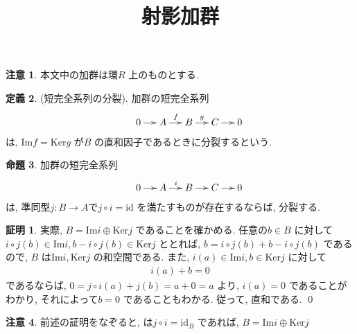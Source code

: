 \documentclass[10pt, fleqn, label-section=none]{bxjsarticle}
\title{射影加群}
\date{}
\author{}
\theoremstyle{definition}
\newtheorem{dfn}{定義}[section]
\newtheorem{prop}[dfn]{命題}
\newtheorem*{pf*}{証明}
\newtheorem{remark}[dfn]{注意}
\newcommand{\Ker}{\textrm{Ker}}
\newcommand{\im}{\textrm{Im}}
\renewcommand{\;}{\, ; \,}
\begin{document}
\maketitle



\section{}

\subsection{}

\begin{remark}
本文中の加群は環$R$ 上のものとする. 
\end{remark}


\begin{dfn}(短完全系列の分裂). 加群の短完全系列
\begin{align*}  \xymatrix@C=13pt{
& 0 \ar[r] &A \ar[r]^f &B \ar[r]^g &C \ar[r] & 0
} \end{align*}
は,  $\textrm{Im} f = \textrm{Ker} g$ が$B$ の直和因子であるときに分裂するという. 
\end{dfn}


\begin{prop}加群の短完全系列
\begin{align*}  \xymatrix@C=13pt{
& 0 \ar[r] &A \ar[r] ^i &B  \ar[r] &C \ar[r] & 0
} \end{align*}
は, 準同型$j: B\rightarrow A$で$j \circ i =  \textrm{id}$ を満たすものが存在するならば, 分裂する. 

\end{prop}
\begin{pf*}
実際, $B = \im i \oplus \Ker j$ であることを確かめる. 任意の$b \in B$ に対して
$i\circ j (b)  \in \im i, b- i \circ j (b) \in \Ker j$ ととれば, $b = i \circ j (b) + b- i \circ j (b)$ であるので, $B$ は$\im i, \Ker j$ の和空間である. また, $i(a) \in \im i, b \in \Ker j$ に対して
\begin{align*} i (a) + b = 0\end{align*}
であるならば, $0 = j \circ i (a) + j(b) = a + 0 = a$ より, $i(a) = 0$ であることがわかり, それによって$b = 0$ であることもわかる. 従って, 直和である. 
\qed
\end{pf*}

\begin{remark}
前述の証明をなぞると,  は$j \circ i = \textrm{id}_B$ であれば, $B = \im i \oplus \Ker j$ 
\end{remark}
\end{document}
